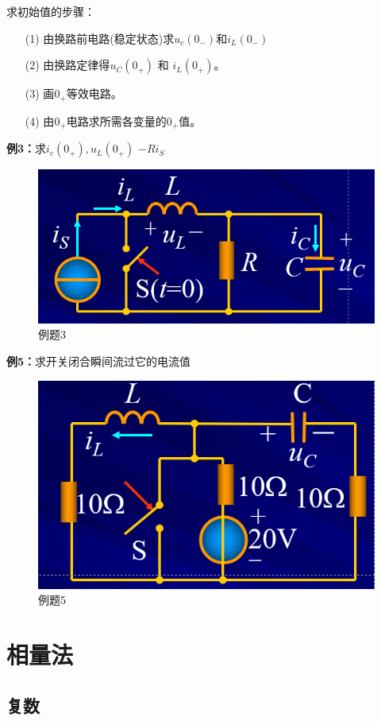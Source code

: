 \documentclass[11pt,a4paper,oneside]{book}
\begin{document}
求初始值的步骤：
\begin{enumerate}
	\item[(1)] 由换路前电路(稳定状态)求$u_c(0_-)$和$i_L(0_-)$
	\item[(2)] 由换路定律得$u_C(0_+)$ 和 $i_L(0_+)$。
	\item[(3)] 画$0_+$等效电路。
	\item[(4)] 由$0_+$电路求所需各变量的$0_+$值。
\end{enumerate}

\noindent\textbf{例3：}求$i_c(0_+),u_L(0_+)$  \quad $-Ri_S$
\begin{figure}[H]
	\centering
	\includegraphics[width=0.5\linewidth]{screenshot085}
	\caption{例题3}
	\label{fig:screenshot085}
\end{figure}

\noindent\textbf{例5：}求开关闭合瞬间流过它的电流值
\begin{figure}[H]
	\centering
	\includegraphics[width=0.5\linewidth]{screenshot086}
	\caption{例题5}
	\label{fig:screenshot086}
\end{figure}


\chapter{相量法}
\section{复数}
\end{document}
